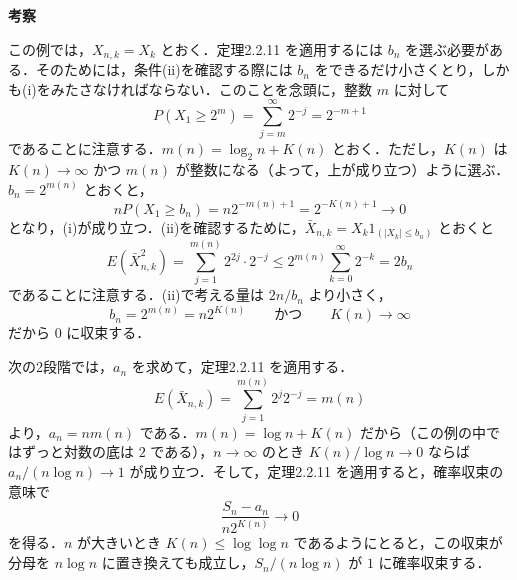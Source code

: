 \documentclass[dvipdfmx]{jsarticle}
\makeatletter
\numberwithin{equation}{section}
\theoremstyle{plain}
\renewenvironment{proof}[1][\proofname]{\par
  \pushQED{\qed}%
  \normalfont \topsep6\p@\@plus6\p@\relax
  \trivlist
  \item\relax
  {\bfseries
  #1\@addpunct{.}}\hspace\labelsep\ignorespaces
}{%
  \popQED\endtrivlist\@endpefalse
}
\renewcommand{\proofname}{証明}
\makeatother
\begin{document}
\begin{proof}[考察]
この例では，$X_{n,k} = X_k$ とおく．定理2.2.11 を適用するには $b_n$ を選ぶ必要がある．そのためには，条件(ii)を確認する際には $b_n$ をできるだけ小さくとり，しかも(i)をみたさなければならない．このことを念頭に，整数 $m$ に対して
\[
  P(X_1 \ge 2^m) = \sum_{j=m}^\infty 2^{-j} = 2^{-m+1}
\]
であることに注意する．$m(n) = \log_2 n + K(n)$ とおく．ただし，$K(n)$ は $K(n) \to \infty$ かつ $m(n)$ が整数になる（よって，上が成り立つ）ように選ぶ．$b_n = 2^{m(n)}$ とおくと，
\[
  nP(X_1 \ge b_n) = n 2^{-m(n)+1} = 2^{-K(n)+1} \to 0
\]
となり，(i)が成り立つ．(ii)を確認するために，$\bar{X}_{n,k} = X_k 1_{(|X_k| \le b_n)}$ とおくと
\[
  E(\bar{X}_{n,k}^2) = \sum_{j=1}^{m(n)} 2^{2j} \cdot 2^{-j} \le 2^{m(n)} \sum_{k=0}^\infty 2^{-k} = 2b_n
\]
であることに注意する．(ii)で考える量は $2n/b_n$ より小さく，
\[
  b_n = 2^{m(n)} = n 2^{K(n)} \qquad \text{かつ} \qquad K(n) \to \infty
\]
だから $0$ に収束する．

次の2段階では，$a_n$ を求めて，定理2.2.11 を適用する．
\[
  E(\bar{X}_{n,k}) = \sum_{j=1}^{m(n)} 2^j 2^{-j} = m(n)
\]
より，$a_n = n m(n)$ である．$m(n) = \log n + K(n)$ だから（この例の中ではずっと対数の底は $2$ である），$n \to \infty$ のとき $K(n)/\log n \to 0$ ならば $a_n/(n\log n) \to 1$ が成り立つ．そして，定理2.2.11 を適用すると，確率収束の意味で
\[
  \frac{S_n - a_n}{n 2^{K(n)}} \to 0
\]
を得る．$n$ が大きいとき $K(n) \le \log\log n$ であるようにとると，この収束が分母を $n\log n$ に置き換えても成立し，$S_n/(n\log n)$ が $1$ に確率収束する．
\end{proof}
\end{document}
